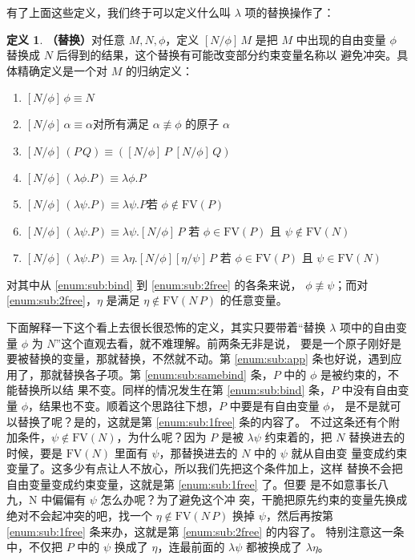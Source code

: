 \documentclass[a4paper,adobefonts]{ctexart}
\newenvironment{tightenum}{
  \begin{enumerate}
    \setlength{\itemindent}{2\ccwd}
    \setlength{\itemsep}{0cm}
    \setlength{\parskip}{0cm}
}{
  \end{enumerate}
}
\theoremstyle{definition}
\newtheorem{definition}{定义}
\begin{document}
有了上面这些定义，我们终于可以定义什么叫 $\lambda$ 项的替换操作了：
\begin{definition}{\bfseries{（替换）}}\label{def:sub}
  对任意 $M,N,\phi$，定义 $[N/\phi]\,M$ 是把 $M$ 中出现的自由变量
  $\phi$ 替换成 $N$ 后得到的结果，这个替换有可能改变部分约束变量名称以
  避免冲突。具体精确定义是一个对 $M$ 的归纳定义：
  \begin{tightenum}
  \item $[N/\phi]\,\phi\equiv N$
  \item $[N/\phi]\,\alpha\equiv\alpha$\hfill 对所有满足
    $\alpha\not\equiv\phi$ 的原子 $\alpha$
  \item $[N/\phi]\,(P\,Q)\equiv([N/\phi]\,P\;[N/\phi]\,Q)$\label{enum:sub:app}
  \item $[N/\phi]\,(\lambda\phi.P)\equiv\lambda\phi.P$\label{enum:sub:samebind}
  \item $[N/\phi]\,(\lambda\psi.P)\equiv\lambda\psi.P$\hfill 若
    $\phi\not\in\text{FV}(P)$\label{enum:sub:bind}
  \item
    $[N/\phi]\,(\lambda\psi.P)\equiv\lambda\psi.[N/\phi]\,P$\hfill
    若 $\phi\in\text{FV}(P)$ 且 $\psi\not\in\text{FV}(N)$\label{enum:sub:1free}
  \item
    $[N/\phi]\,(\lambda\psi.P)\equiv\lambda\eta.[N/\phi][\eta/\psi]\,P$\hfill
    若 $\phi\in\text{FV}(P)$ 且 $\psi\in\text{FV}(N)$\label{enum:sub:2free}
  \end{tightenum}
  对其中从 \ref{enum:sub:bind} 到 \ref{enum:sub:2free} 的各条来说，
  $\phi\not\equiv\psi$；而对 \ref{enum:sub:2free}，$\eta$ 是满足
  $\eta\not\in\text{FV}(N\,P)$ 的任意变量。
\end{definition}

下面解释一下这个看上去很长很恐怖的定义，其实只要带着``替换 $\lambda$
项中的自由变量 $\phi$ 为 $N$''这个直观去看，就不难理解。前两条无非是说，
要是一个原子刚好是要被替换的变量，那就替换，不然就不动。第
\ref{enum:sub:app} 条也好说，遇到应用了，那就替换各子项。第
\ref{enum:sub:samebind} 条，$P$ 中的 $\phi$ 是被约束的，不能替换所以结
果不变。同样的情况发生在第 \ref{enum:sub:bind} 条，$P$ 中没有自由变量
$\phi$，结果也不变。顺着这个思路往下想，$P$ 中要是有自由变量 $\phi$，
是不是就可以替换了呢？是的，这就是第 \ref{enum:sub:1free} 条的内容了。
不过这条还有个附加条件，$\psi\not\in\text{FV}(N)$，为什么呢？因为 $P$
是被 $\lambda\psi$ 约束着的，把 $N$ 替换进去的时候，要是
$\text{FV}(N)$ 里面有 $\psi$，那替换进去的 $N$ 中的 $\psi$ 就从自由变
量变成约束变量了。这多少有点让人不放心，所以我们先把这个条件加上，这样
替换不会把自由变量变成约束变量，这就是第 \ref{enum:sub:1free} 了。但要
是不如意事长八九，$\text{N}$ 中偏偏有 $\psi$ 怎么办呢？为了避免这个冲
突，干脆把原先约束的变量先换成绝对不会起冲突的吧，找一个
$\eta\not\in\text{FV}(N\,P)$ 换掉 $\psi$，然后再按第
\ref{enum:sub:1free} 条来办，这就是第 \ref{enum:sub:2free} 的内容了。
特别注意这一条中，不仅把 $P$ 中的 $\psi$ 换成了 $\eta$，连最前面的
$\lambda\psi$ 都被换成了 $\lambda\eta$。
\end{document}
